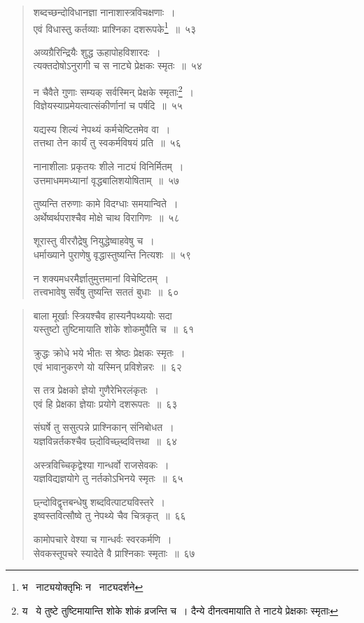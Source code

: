 \documentclass[11pt, openany]{book}
\begin{document}
\begin{quote}
{\na शब्दच्छन्दोविधानज्ञा नानाशास्त्रविचक्षणाः~।\\
एवं विधास्तु कर्तव्याः प्राश्निका दशरूपके\renewcommand{\thefootnote}{1}\footnote{भ \textendash\  नाट्ययोक्तृभिः न \textendash\  नाट्यदर्शने}~॥~५३ 

अव्यग्रैरिन्द्रियैः शुद्ध ऊहापोहविशारदः~।\\
त्यक्तदोषोऽनुरागी च स नाट्ये प्रेक्षकः स्मृतः~॥~५४

न चैवैते गुणाः सम्यक् सर्वस्मिन् प्रेक्षके स्मृताः\renewcommand{\thefootnote}{2}\footnote{य \textendash\  ये तुष्टे तुष्टिमायान्ति शोके शोकं व्रजन्ति च~। दैन्ये दीनत्वमायाति ते नाटये प्रेक्षकाः स्मृताः}~।\\
विज्ञेयस्याप्रमेयत्वात्संकीर्णानां च पर्षदि~॥~५५

यद्यस्य शिल्यं नेपथ्यं कर्मचेष्टितमेव वा~।\\
तत्तथा तेन कार्यं तु स्वकर्मविषयं प्रति~॥~५६

नानाशीलाः प्रकृतयः शीले नाट्यं विनिर्मितम्~।\\
उत्तमाधममध्यानां वृद्धबालिशयोषिताम्~॥~५७

तुष्यन्ति तरुणाः कामे विदग्धाः समयान्विते~।\\
अर्थेष्वर्थपराश्चैव मोक्षे चाथ विरागिणः~॥~५८

शूरास्तु वीररौद्रेषु नियुद्धेष्वाहवेषु च~।\\
धर्माख्याने पुराणेषु वृद्धास्तुष्यन्ति नित्यशः~॥~५९ 

न शक्यमधरमैर्ज्ञातुमुत्तमानां विचेष्टितम्~।\\
तत्त्वभावेषु सर्वेषु तुष्यन्ति सततं बुधाः~॥~६०}
\end{quote}

\newpage

\begin{quote}
{\na बाला मूर्खाः स्त्रियश्चैव हास्यनैपथ्ययोः सदा\\
यस्तुष्टो तुष्टिमायाति शोके शोकमुपैति च~॥~६१ 

क्रुद्धः क्रोधे भये भीतः स श्रेष्ठः प्रेक्षकः स्मृतः~।\\
एवं भावानुकरणे यो यस्मिन् प्रविशेन्नरः~॥~६२

स तत्र प्रेक्षको ज्ञेयो गुणैरेभिरलंकृतः~।\\
एवं हि प्रेक्षका ज्ञेयाः प्रयोगे दशरूपतः~॥~६३ 

संघर्षे तु ससुत्पन्ने प्राश्निकान् संनिबोधत~।\\
यज्ञविन्नर्तकश्चैव छ्दोविच्छ्ब्दवित्तथा~॥~६४

अस्त्रविच्चिकृद्वेश्या गान्धर्वो राजसेवकः~।\\
यज्ञविद्यज्ञयोगे तु नर्तकोऽभिनये स्मृतः~॥~६५

छ्न्दोविद्वृत्तबन्धेषु शब्दवित्पाट्यविस्तरे~।\\
इष्वस्तवित्सौष्वे तु नेपथ्ये चैव चित्रकृत्~॥~६६

कामोपचारे वेश्या च गान्धर्वः स्वरकर्मणि~।\\
सेवकस्तूपचरे स्यादेते वै प्राश्निकाः स्मृताः~॥~६७}
\end{quote}
\end{document}
